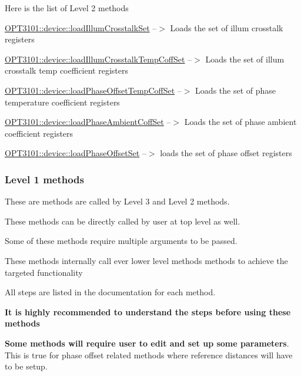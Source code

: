 Here is the list of Level 2 methods
\begin{DoxyEnumerate}
\item \mbox{\hyperlink{class_o_p_t3101_1_1device_a48b320dfe4376bf62043d10ba937e8cd}{O\+P\+T3101\+::device\+::load\+Illum\+Crosstalk\+Set}} --$>$ Loads the set of illum crosstalk registers
\item \mbox{\hyperlink{class_o_p_t3101_1_1device_ab384cacd80cd32643b7029fe59428e92}{O\+P\+T3101\+::device\+::load\+Illum\+Crosstalk\+Temp\+Coff\+Set}} --$>$ Loads the set of illum crosstalk temp coefficient registers
\item \mbox{\hyperlink{class_o_p_t3101_1_1device_a69d7fbb471d186845242774d7f2c86a8}{O\+P\+T3101\+::device\+::load\+Phase\+Offset\+Temp\+Coff\+Set}} --$>$ Loads the set of phase temperature coefficient registers
\item \mbox{\hyperlink{class_o_p_t3101_1_1device_ac70129fa0dacd700b19349087f000f76}{O\+P\+T3101\+::device\+::load\+Phase\+Ambient\+Coff\+Set}} --$>$ Loads the set of phase ambient coefficient registers
\item \mbox{\hyperlink{class_o_p_t3101_1_1device_a9fed055b5998d93bd37f26388ec8b0a8}{O\+P\+T3101\+::device\+::load\+Phase\+Offset\+Set}} --$>$ loads the set of phase offset registers
\end{DoxyEnumerate}

\subsubsection*{Level 1 methods}


\begin{DoxyItemize}
\item These are methods are called by Level 3 and Level 2 methods.
\item These methods can be directly called by user at top level as well.
\item Some of these methods require multiple arguments to be passed.
\item These methods internally call ever lower level methods methods to achieve the targeted functionality
\item All steps are listed in the documentation for each method.
\item {\bfseries It is highly recommended to understand the steps before using these methods}
\item {\bfseries Some methods will require user to edit and set up some parameters}. This is true for phase offset related methods where reference distances will have to be setup.
\end{DoxyItemize}


